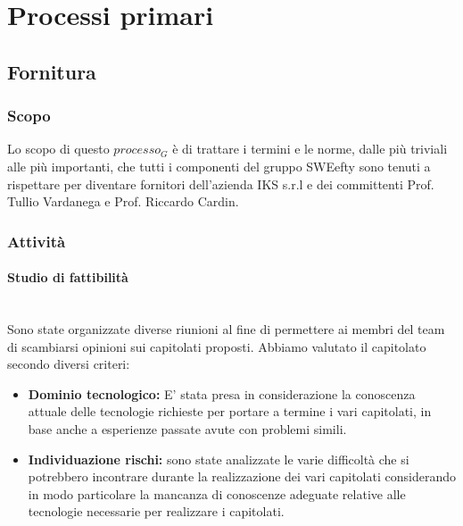 \section{Processi primari}

\subsection{Fornitura}
	
	\subsubsection{Scopo}
		Lo scopo di questo $processo_G$ è di trattare i termini e le norme, dalle più triviali alle più importanti, che tutti i componenti del gruppo SWEefty sono tenuti a rispettare per diventare fornitori dell'azienda IKS s.r.l e dei committenti Prof. Tullio Vardanega e Prof. Riccardo Cardin.
	\subsubsection{Attività} 
		\paragraph{Studio di fattibilità} \mbox{} \\
		Sono state organizzate diverse riunioni al fine di permettere ai membri del team di scambiarsi opinioni sui capitolati proposti. 
		Abbiamo valutato il capitolato secondo diversi criteri:
		\begin{itemize}
			\item \textbf{Dominio tecnologico:} E' stata presa in considerazione la conoscenza attuale delle tecnologie richieste per portare a termine i vari capitolati, in base
			anche a esperienze passate avute con problemi simili.
			\item \textbf{Individuazione rischi:} sono state analizzate le varie difficoltà che si potrebbero incontrare durante la realizzazione dei vari capitolati considerando 
			in modo particolare la mancanza di conoscenze adeguate relative alle tecnologie necessarie per realizzare i capitolati.
		\end{itemize}  
